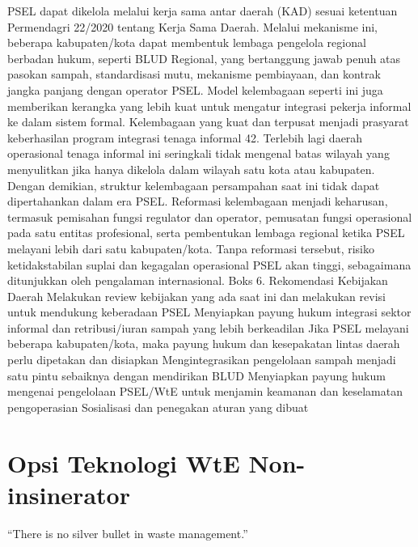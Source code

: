 \documentclass[
  letterpaper,
  DIV=11,
  numbers=noendperiod]{scrreprt}
\begin{document}
PSEL dapat dikelola melalui kerja sama antar daerah (KAD) sesuai
ketentuan Permendagri 22/2020 tentang Kerja Sama Daerah. Melalui
mekanisme ini, beberapa kabupaten/kota dapat membentuk lembaga pengelola
regional berbadan hukum, seperti BLUD Regional, yang bertanggung jawab
penuh atas pasokan sampah, standardisasi mutu, mekanisme pembiayaan, dan
kontrak jangka panjang dengan operator PSEL. Model kelembagaan seperti
ini juga memberikan kerangka yang lebih kuat untuk mengatur integrasi
pekerja informal ke dalam sistem formal. Kelembagaan yang kuat dan
terpusat menjadi prasyarat keberhasilan program integrasi tenaga
informal 42. Terlebih lagi daerah operasional tenaga informal ini
seringkali tidak mengenal batas wilayah yang menyulitkan jika hanya
dikelola dalam wilayah satu kota atau kabupaten. Dengan demikian,
struktur kelembagaan persampahan saat ini tidak dapat dipertahankan
dalam era PSEL. Reformasi kelembagaan menjadi keharusan, termasuk
pemisahan fungsi regulator dan operator, pemusatan fungsi operasional
pada satu entitas profesional, serta pembentukan lembaga regional ketika
PSEL melayani lebih dari satu kabupaten/kota. Tanpa reformasi tersebut,
risiko ketidakstabilan suplai dan kegagalan operasional PSEL akan
tinggi, sebagaimana ditunjukkan oleh pengalaman internasional. Boks 6.
Rekomendasi Kebijakan Daerah Melakukan review kebijakan yang ada saat
ini dan melakukan revisi untuk mendukung keberadaan PSEL Menyiapkan
payung hukum integrasi sektor informal dan retribusi/iuran sampah yang
lebih berkeadilan Jika PSEL melayani beberapa kabupaten/kota, maka
payung hukum dan kesepakatan lintas daerah perlu dipetakan dan disiapkan
Mengintegrasikan pengelolaan sampah menjadi satu pintu sebaiknya dengan
mendirikan BLUD Menyiapkan payung hukum mengenai pengelolaan PSEL/WtE
untuk menjamin keamanan dan keselamatan pengoperasian Sosialisasi dan
penegakan aturan yang dibuat


\chapter{Opsi Teknologi WtE
Non-insinerator}\label{opsi-teknologi-wte-non-insinerator}

``There is no silver bullet in waste management.''
\end{document}
